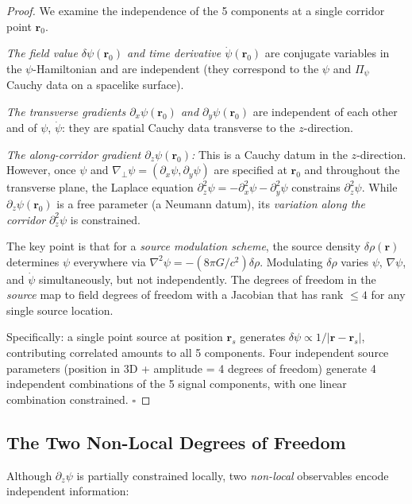 \documentclass[aps,prd,twocolumn,superscriptaddress,nofootinbib]{revtex4-2}
\begin{document}
\begin{proof}
We examine the independence of the 5 components at a single corridor
point $\mathbf{r}_0$.

\emph{The field value $\delta\psi(\mathbf{r}_0)$ and time derivative
$\dot\psi(\mathbf{r}_0)$} are conjugate variables in the $\psi$-Hamiltonian
and are independent (they correspond to the $\psi$ and $\Pi_\psi$ Cauchy
data on a spacelike surface).

\emph{The transverse gradients $\partial_x\psi(\mathbf{r}_0)$ and
$\partial_y\psi(\mathbf{r}_0)$} are independent of each other and of
$\psi$, $\dot\psi$: they are spatial Cauchy data transverse to the
$z$-direction.

\emph{The along-corridor gradient $\partial_z\psi(\mathbf{r}_0)$:}
This is a Cauchy datum in the $z$-direction. However, once $\psi$ and
$\nabla_\perp\psi = (\partial_x\psi, \partial_y\psi)$ are specified at
$\mathbf{r}_0$ and throughout the transverse plane, the Laplace equation
$\partial_z^2\psi = -\partial_x^2\psi - \partial_y^2\psi$ constrains
$\partial_z^2\psi$. While $\partial_z\psi(\mathbf{r}_0)$ is a free
parameter (a Neumann datum), its \emph{variation along the corridor}
$\partial_z^2\psi$ is constrained.

The key point is that for a \emph{source modulation scheme}, the source
density $\delta\rho(\mathbf{r})$ determines $\psi$ everywhere via
$\nabla^2\psi = -(8\pi G/c^2)\delta\rho$. Modulating $\delta\rho$ varies
$\psi$, $\nabla\psi$, and $\dot\psi$ simultaneously, but not independently.
The degrees of freedom in the \emph{source} map to field degrees of freedom
with a Jacobian that has rank $\leq 4$ for any single source location.

Specifically: a single point source at position $\mathbf{r}_s$ generates
$\delta\psi \propto 1/|\mathbf{r}-\mathbf{r}_s|$, contributing correlated
amounts to all 5 components. Four independent source parameters
(position in 3D + amplitude = 4 degrees of freedom) generate 4
independent combinations of the 5 signal components, with one linear
combination constrained. $\square$
\end{proof}

\subsection{The Two Non-Local Degrees of Freedom}

Although $\partial_z\psi$ is partially constrained locally, two
\emph{non-local} observables encode independent information:
\end{document}
